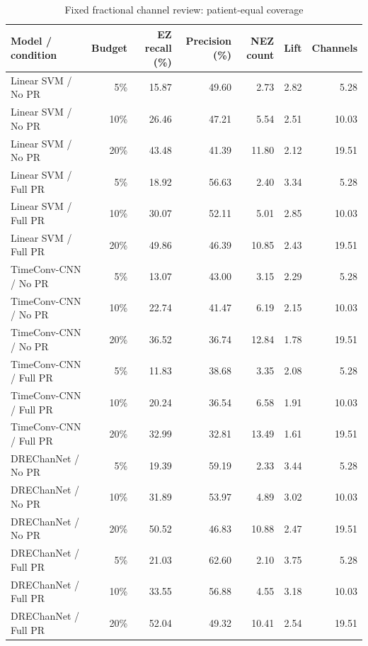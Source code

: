 \begin{table}[t]
\centering
\caption{Fixed fractional channel review: patient-equal coverage}
\small
\begin{tabular}{lrrrrrr}
\toprule
Model / condition & Budget & EZ recall (\%) & Precision (\%) & NEZ count & Lift & Channels \\
\midrule
Linear SVM / No PR & 5\% & 15.87 & 49.60 & 2.73 & 2.82 & 5.28 \\
Linear SVM / No PR & 10\% & 26.46 & 47.21 & 5.54 & 2.51 & 10.03 \\
Linear SVM / No PR & 20\% & 43.48 & 41.39 & 11.80 & 2.12 & 19.51 \\
Linear SVM / Full PR & 5\% & 18.92 & 56.63 & 2.40 & 3.34 & 5.28 \\
Linear SVM / Full PR & 10\% & 30.07 & 52.11 & 5.01 & 2.85 & 10.03 \\
Linear SVM / Full PR & 20\% & 49.86 & 46.39 & 10.85 & 2.43 & 19.51 \\
TimeConv-CNN / No PR & 5\% & 13.07 & 43.00 & 3.15 & 2.29 & 5.28 \\
TimeConv-CNN / No PR & 10\% & 22.74 & 41.47 & 6.19 & 2.15 & 10.03 \\
TimeConv-CNN / No PR & 20\% & 36.52 & 36.74 & 12.84 & 1.78 & 19.51 \\
TimeConv-CNN / Full PR & 5\% & 11.83 & 38.68 & 3.35 & 2.08 & 5.28 \\
TimeConv-CNN / Full PR & 10\% & 20.24 & 36.54 & 6.58 & 1.91 & 10.03 \\
TimeConv-CNN / Full PR & 20\% & 32.99 & 32.81 & 13.49 & 1.61 & 19.51 \\
DREChanNet / No PR & 5\% & 19.39 & 59.19 & 2.33 & 3.44 & 5.28 \\
DREChanNet / No PR & 10\% & 31.89 & 53.97 & 4.89 & 3.02 & 10.03 \\
DREChanNet / No PR & 20\% & 50.52 & 46.83 & 10.88 & 2.47 & 19.51 \\
DREChanNet / Full PR & 5\% & 21.03 & 62.60 & 2.10 & 3.75 & 5.28 \\
DREChanNet / Full PR & 10\% & 33.55 & 56.88 & 4.55 & 3.18 & 10.03 \\
DREChanNet / Full PR & 20\% & 52.04 & 49.32 & 10.41 & 2.54 & 19.51 \\
\bottomrule
\end{tabular}
\end{table}

